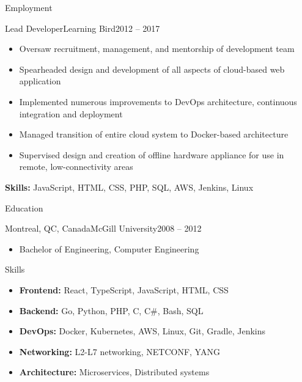 \documentclass[]{cv}
\begin{document}
\begin{cvsection}{Employment}
		\begin{cvsubsection}{Lead Developer}{Learning Bird}{2012 -- 2017}
			\begin{itemize}
				\item Oversaw recruitment, management, and mentorship of development team
				\item Spearheaded design and development of all aspects of cloud-based web application
				\item Implemented numerous improvements to DevOps architecture, continuous integration and deployment
				\item Managed transition of entire cloud system to Docker-based architecture
				\item Supervised design and creation of offline hardware appliance for use in remote, low-connectivity areas
			\end{itemize}
			\small{\textbf{Skills:} JavaScript, HTML, CSS, PHP, SQL, AWS, Jenkins, Linux}
		\end{cvsubsection}
	\end{cvsection}

	\begin{cvsection}{Education}
		\begin{cvsubsection}{Montreal, QC, Canada}{McGill University}{2008 -- 2012}
			\begin{itemize}
				\item Bachelor of Engineering, Computer Engineering
			\end{itemize}
		\end{cvsubsection}
	\end{cvsection}

	\begin{cvsection}{Skills}
		\begin{cvsubsection}{}{}{}
			\begin{itemize}
				\item \textbf{Frontend:} React, TypeScript, JavaScript, HTML, CSS
				\item \textbf{Backend:} Go, Python, PHP, C, C\#, Bash, SQL
				\item \textbf{DevOps:} Docker, Kubernetes, AWS, Linux, Git, Gradle, Jenkins
				\item \textbf{Networking:} L2-L7 networking, NETCONF, YANG
				\item \textbf{Architecture:} Microservices, Distributed systems
			\end{itemize}
		\end{cvsubsection}
	\end{cvsection}
\end{document}
